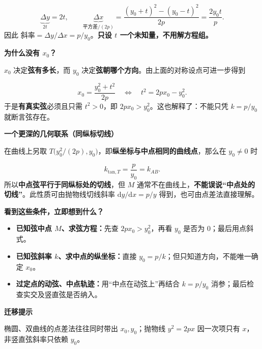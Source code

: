 \begin{explanationbox}
\[
\underbrace{\Delta y}_{2t}=2t,\qquad
\underbrace{\Delta x}_{\text{平方差}/(2p)}
=\frac{(y_0+t)^2-(y_0-t)^2}{2p}
=\frac{2y_0t}{p}.
\]
因此 $\text{斜率}=\Delta y/\Delta x=p/y_0$。\textbf{只设 $t$ 一个未知量，不用解方程组。}
\par\medskip
\begin{minipage}{\linewidth}
\noindent
\textbf{\textcolor{CExplanation}{为什么没有 $x_0$？}}\par\nobreak\smallskip
$x_0$ 决定\textbf{弦有多长}，而 $y_0$ 决定\textbf{弦朝哪个方向}。由上面的对称设点可进一步得到\par
\end{minipage}
\par

\[
 x_0=\frac{y_0^2+t^2}{2p}
 \quad\Longleftrightarrow\quad
 t^2=2px_0-y_0^2.
\]
于是\textbf{有真实弦}必须且只需 $t^2>0$，即 $2px_0>y_0^2$。这也解释了：不能只凭 $k=p/y_0$ 就断言弦存在。
\par\medskip
\begin{minipage}{\linewidth}
\noindent
\textbf{\textcolor{CExplanation}{一个更深的几何联系（同纵标切线）}}\par\nobreak\smallskip
在曲线上另取 $T\bigl(y_0^2/(2p),y_0\bigr)$，即\textbf{纵坐标与中点相同的曲线点}，那么在 $y_0\ne0$ 时\par
\end{minipage}
\par

\[
 k_{\mathrm{tan},T}=\frac{p}{y_0}=k_{AB}.
\]
所以\textbf{中点弦平行于同纵标处的切线}，但 $M$ 通常不在曲线上，\textbf{不能误说“中点处的切线”}。此性质可由抛物线切线斜率 $\mathrm{d}y/\mathrm{d}x=p/y$ 得到，也可由点差法直接理解。
\par\medskip
\begin{minipage}{\linewidth}
\noindent
\textbf{\textcolor{CExplanation}{看到这些条件，立即想到什么？}}\par\nobreak\smallskip
\begin{itemize}[leftmargin=*,itemsep=0.4em]
 \item \textbf{已知弦中点 $M$、求弦方程：}先查 $2px_0>y_0^2$，再看 $y_0$ 是否为 $0$；最后用点斜式。
 \item \textbf{已知弦斜率 $k$、求中点的纵坐标：}直接 $y_0=p/k$；但只知道方向，不能唯一确定 $x_0$。
 \item \textbf{过定点的动弦、中点轨迹：}用“中点在动弦上”再结合 $k=p/y_0$ 消参；最后检查实交及竖直弦是否纳入。
\end{itemize}\par
\end{minipage}
\par

\par\medskip
\begin{minipage}{\linewidth}
\noindent
\textbf{\textcolor{CExplanation}{迁移提示}}\par\nobreak\smallskip
椭圆、双曲线的点差法往往同时带出 $x_0,y_0$；抛物线 $y^2=2px$ 因一次项只有 $x$，非竖直弦斜率只依赖 $y_0$。\par
\end{minipage}
\par

\end{explanationbox}
